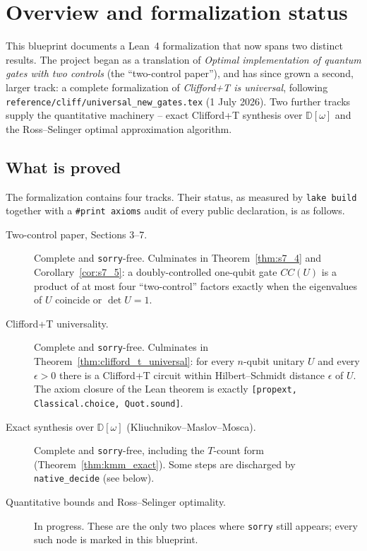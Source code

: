 \section{Overview and formalization status}

This blueprint documents a Lean~4 formalization that now spans two distinct
results.  The project began as a translation of
\emph{Optimal implementation of quantum gates with two controls}
(the ``two-control paper''), and has since grown a second, larger track: a
complete formalization of \emph{Clifford+T is universal}, following
\texttt{reference/cliff/universal\_new\_gates.tex} (1 July 2026).  Two further
tracks supply the quantitative machinery -- exact Clifford+T synthesis over
$\mathbb{D}[\omega]$ and the Ross--Selinger optimal approximation algorithm.

\subsection{What is proved}

The formalization contains four tracks.  Their status, as measured by
\texttt{lake build} together with a \texttt{\#print axioms} audit of every
public declaration, is as follows.

\begin{description}
  \item[Two-control paper, Sections 3--7.] Complete and \texttt{sorry}-free.
    Culminates in Theorem~\ref{thm:s7_4} and Corollary~\ref{cor:s7_5}:
    a doubly-controlled one-qubit gate $CC(U)$ is a product of at most four
    ``two-control'' factors exactly when the eigenvalues of $U$ coincide or
    $\det U = 1$.
  \item[Clifford+T universality.] Complete and \texttt{sorry}-free.
    Culminates in Theorem~\ref{thm:clifford_t_universal}: for every
    $n$-qubit unitary $U$ and every $\epsilon > 0$ there is a Clifford+T
    circuit within Hilbert--Schmidt distance $\epsilon$ of $U$.  The axiom
    closure of the Lean theorem is exactly
    \texttt{[propext, Classical.choice, Quot.sound]}.
  \item[{Exact synthesis over $\mathbb{D}[\omega]$ (Kliuchnikov--Maslov--Mosca).}]
    Complete and \texttt{sorry}-free, including the $T$-count form
    (Theorem~\ref{thm:kmm_exact}).  Some steps are discharged by
    \texttt{native\_decide} (see below).
  \item[Quantitative bounds and Ross--Selinger optimality.] In progress.
    These are the only two places where \texttt{sorry} still appears; every
    such node is marked in this blueprint.
\end{description}


